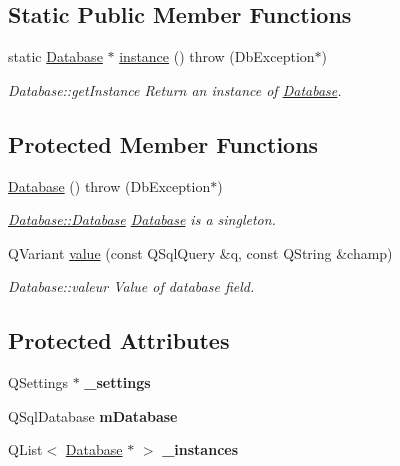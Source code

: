 \subsection*{Static Public Member Functions}
\begin{DoxyCompactItemize}
\item 
static \hyperlink{classDatabase}{Database} $\ast$ \hyperlink{classDatabase_aa334760d1e18f82a344fb696547bfa5c}{instance} ()  throw (\-Db\-Exception$\ast$)
\begin{DoxyCompactList}\small\item\em Database\-::get\-Instance Return an instance of \hyperlink{classDatabase}{Database}. \end{DoxyCompactList}\end{DoxyCompactItemize}
\subsection*{Protected Member Functions}
\begin{DoxyCompactItemize}
\item 
\hypertarget{classDatabase_a4703c80e6969d33565ea340f768fdadf}{\hyperlink{classDatabase_a4703c80e6969d33565ea340f768fdadf}{Database} ()  throw (\-Db\-Exception$\ast$)}\label{classDatabase_a4703c80e6969d33565ea340f768fdadf}

\begin{DoxyCompactList}\small\item\em \hyperlink{classDatabase_a4703c80e6969d33565ea340f768fdadf}{Database\-::\-Database} \hyperlink{classDatabase}{Database} is a singleton. \end{DoxyCompactList}\item 
Q\-Variant \hyperlink{classDatabase_a88f0ccd102fc421fb10ddad0fd94e8c1}{value} (const Q\-Sql\-Query \&q, const Q\-String \&champ)
\begin{DoxyCompactList}\small\item\em Database\-::valeur Value of database field. \end{DoxyCompactList}\end{DoxyCompactItemize}
\subsection*{Protected Attributes}
\begin{DoxyCompactItemize}
\item 
\hypertarget{classDatabase_a6cde413cb6d644c835406c09ec37947e}{Q\-Settings $\ast$ {\bfseries \-\_\-settings}}\label{classDatabase_a6cde413cb6d644c835406c09ec37947e}

\item 
\hypertarget{classDatabase_a64b9dbb3a5e6f42447a24caf726782e1}{Q\-Sql\-Database {\bfseries m\-Database}}\label{classDatabase_a64b9dbb3a5e6f42447a24caf726782e1}

\item 
\hypertarget{classDatabase_a9202583fae82c7f4ecbda6cb11b978c8}{Q\-List$<$ \hyperlink{classDatabase}{Database} $\ast$ $>$ {\bfseries \-\_\-instances}}\label{classDatabase_a9202583fae82c7f4ecbda6cb11b978c8}

\end{DoxyCompactItemize}
